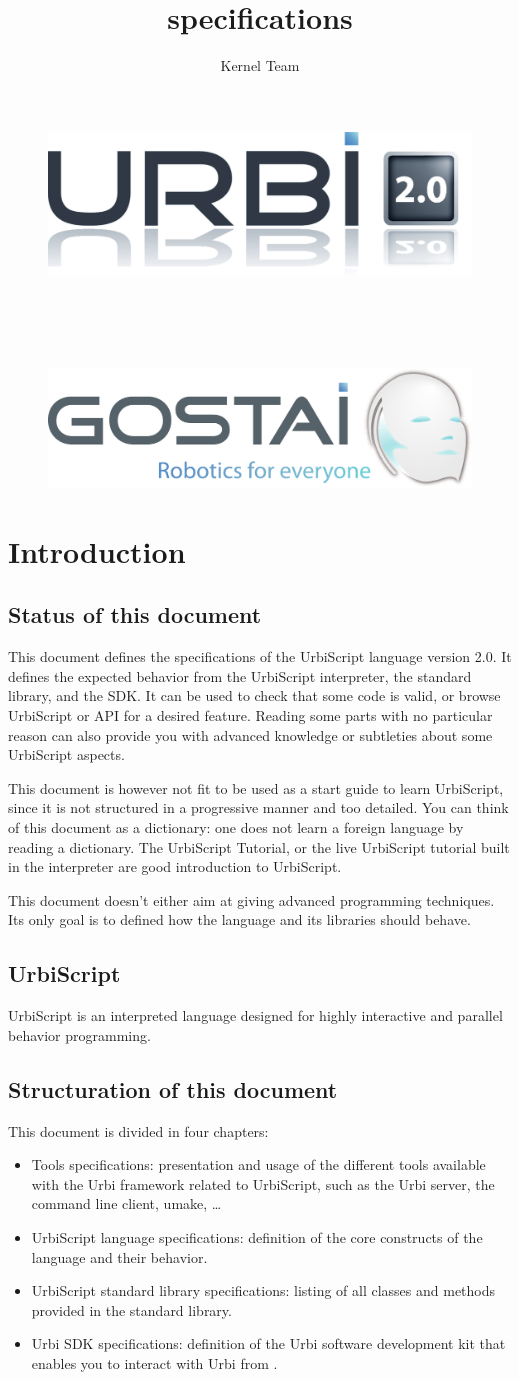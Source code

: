 \documentclass[openright,twoside,12pt]{report}
\title{\us 2.0 specifications}
\author{Kernel Team}
\makeatletter
\newcommand{\api}{API\xspace}
\newcommand{\sdk}{SDK\xspace}
\newcommand{\urbi}{Urbi\xspace}
\newcommand{\umake}{umake\xspace}
\newcommand{\us}{UrbiScript\xspace}
\renewcommand{\maketitle}{
  \begin{titlepage}

    \vfill

    \begin{figure}[htp]
      \centering
      \includegraphics[width=12cm]{img/urbi-logo}
    \end{figure}

    \begin{center}
      {\Huge\bf\@title\\}
      \vspace{1cm}
      {\Large \@author\\}
      \vspace{1cm}
      {\large \@date\\}
    \end{center}

    \vfill

    \begin{figure}[htp]
      \centering
      \includegraphics[width=12cm]{img/gostai}
    \end{figure}

    \vfill
    \global\let\title\relax
  \end{titlepage}
}
\makeatother
\begin{document}
\maketitle
\tableofcontents

\chapter{Introduction}

\section{Status of this document}

This document defines the specifications of the \us language version
2.0. It defines the expected behavior from the \us interpreter, the
standard library, and the \sdk. It can be used to check that some code
is valid, or browse \us or \Cxx \api for a desired feature. Reading
some parts with no particular reason can also provide you with
advanced knowledge or subtleties about some \us aspects.

This document is however not fit to be used as a start guide to learn
\us, since it is not structured in a progressive manner and too
detailed. You can think of this document as a dictionary: one does not
learn a foreign language by reading a dictionary. The \us Tutorial, or
the live \us tutorial built in the interpreter are good introduction
to \us.

This document doesn't either aim at giving advanced programming
techniques. Its only goal is to defined how the language and its
libraries should behave.

\section{\us}

\us is an interpreted language designed for highly interactive and
parallel behavior programming. %

\section{Structuration of this document}

This document is divided in four chapters:

\begin{itemize}
\item Tools specifications: presentation and usage of the different
  tools available with the \urbi framework related to \us, such as the
  \urbi server, the command line client, \umake, \ldots
\item \us language specifications: definition of the core constructs
  of the language and their behavior.
\item \us standard library specifications: listing of all classes and
  methods provided in the standard library.
\item \urbi \sdk specifications: definition of the \urbi software
  development kit that enables you to interact with \urbi from \Cxx.
\end{itemize}
\end{document}
